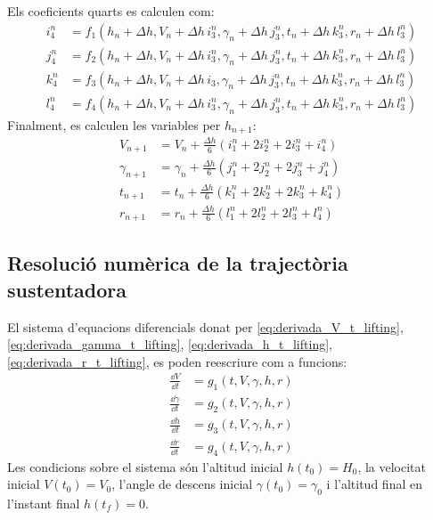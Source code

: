 Els coeficients quarts es calculen com:
\begin{align}
    i_4^n &= f_1 \left( h_n + \Delta h, V_n + \Delta h \, i_3^n, \gamma_n + \Delta h \, j_3^n, 
    t_n + \Delta h \, k_3^n, r_n + \Delta h \, l_3^n \right) \\
    j_4^n &= f_2 \left( h_n + \Delta h, V_n + \Delta h \, i_3^n, \gamma_n + \Delta h \, j_3^n, 
    t_n + \Delta h \, k_3^n, r_n + \Delta h \, l_3^n \right) \\
    k_4^n &= f_3 \left( h_n + \Delta h, V_n + \Delta h \, i_3, \gamma_n + \Delta h \, j_3^n, 
    t_n + \Delta h \, k_3^n, r_n + \Delta h \, l_3^n \right) \\
    l_4^n &= f_4 \left( h_n + \Delta h, V_n + \Delta h \, i_3^n, \gamma_n + \Delta h \, j_3^n, 
    t_n + \Delta h \, k_3^n, r_n + \Delta h \, l_3^n \right)
\end{align}
Finalment, es calculen les variables per $h_{n+1}$:
\begin{align}
    V_{n+1} &= V_n              + \frac{\Delta h}{6} \left( i_1^n + 2 i_2^n + 2 i_3^n + i_4^n \right) \\
    \gamma_{n+1} &= \gamma_n    + \frac{\Delta h}{6} \left( j_1^n + 2 j_2^n + 2 j_3^n + j_4^n \right) \\
    t_{n+1} &= t_n              + \frac{\Delta h}{6} \left( k_1^n + 2 k_2^n + 2 k_3^n + k_4^n \right) \\
    r_{n+1} &= r_n              + \frac{\Delta h}{6} \left( l_1^n + 2 l_2^n + 2 l_3^n + l_4^n \right)
\end{align}

\subsection{Resolució numèrica de la trajectòria sustentadora}

El sistema d'equacions diferencials donat per \eqref{eq:derivada_V_t_lifting}, \eqref{eq:derivada_gamma_t_lifting}, \eqref{eq:derivada_h_t_lifting}, \eqref{eq:derivada_r_t_lifting}, es poden reescriure com a funcions:
\begin{align}
    \frac{\dd V}{\dd t} &=      g_1 \left( t, V, \gamma, h, r \right) \\
    \frac{\dd \gamma}{\dd t} &= g_2 \left( t, V, \gamma, h, r \right) \\
    \frac{\dd h}{\dd t} &=      g_3 \left( t, V, \gamma, h, r \right) \\
    \frac{\dd r}{\dd t} &=      g_4 \left( t, V, \gamma, h, r \right)
\end{align}
Les condicions sobre el sistema són l'altitud inicial $h(t_0) = H_0$, la velocitat inicial $V(t_0) = V_0$, l'angle de descens inicial $\gamma(t_0) = \gamma_0$ i l'altitud final en l'instant final $h(t_f) = 0$.

